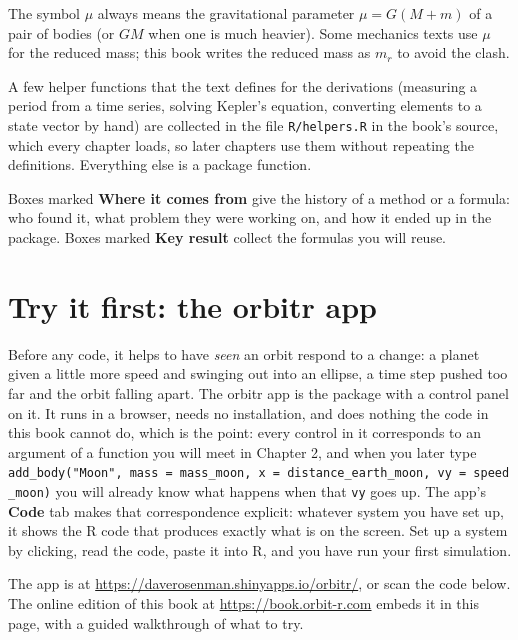 \documentclass[
  10.5pt,
  letterpaper,
]{scrbook}
\theoremstyle{plain}
\theoremstyle{remark}
\begin{document}
The symbol \(\mu\) always means the gravitational parameter
\(\mu = G(M + m)\) of a pair of bodies (or \(GM\) when one is much
heavier). Some mechanics texts use \(\mu\) for the reduced mass; this
book writes the reduced mass as \(m_r\) to avoid the clash.

A few helper functions that the text defines for the derivations
(measuring a period from a time series, solving Kepler's equation,
converting elements to a state vector by hand) are collected in the file
\texttt{R/helpers.R} in the book's source, which every chapter loads, so
later chapters use them without repeating the definitions. Everything
else is a package function.

Boxes marked \textbf{Where it comes from} give the history of a method
or a formula: who found it, what problem they were working on, and how
it ended up in the package. Boxes marked \textbf{Key result} collect the
formulas you will reuse.

\section*{Try it first: the orbitr
app}\label{try-it-first-the-orbitr-app}


Before any code, it helps to have \emph{seen} an orbit respond to a
change: a planet given a little more speed and swinging out into an
ellipse, a time step pushed too far and the orbit falling apart. The
orbitr app is the package with a control panel on it. It runs in a
browser, needs no installation, and does nothing the code in this book
cannot do, which is the point: every control in it corresponds to an
argument of a function you will meet in Chapter 2, and when you later
type
\texttt{add\_body("Moon",\ mass\ =\ mass\_moon,\ x\ =\ distance\_earth\_moon,\ vy\ =\ speed\_moon)}
you will already know what happens when that \texttt{vy} goes up. The
app's \textbf{Code} tab makes that correspondence explicit: whatever
system you have set up, it shows the R code that produces exactly what
is on the screen. Set up a system by clicking, read the code, paste it
into R, and you have run your first simulation.

The app is at \url{https://daverosenman.shinyapps.io/orbitr/}, or scan
the code below. The online edition of this book at
\url{https://book.orbit-r.com} embeds it in this page, with a guided
walkthrough of what to try.
\end{document}
